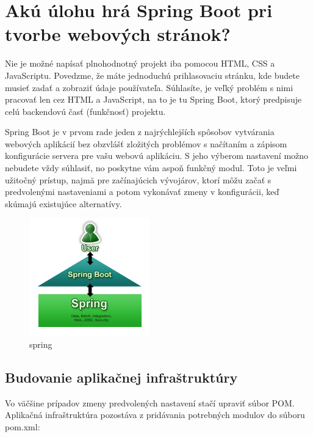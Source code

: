 \documentclass[12pt, letterpaper]{article}
\begin{document}
\section{Akú úlohu hrá Spring Boot pri tvorbe webových stránok?}
Nie je možné napísať plnohodnotný projekt iba pomocou HTML, CSS a JavaScriptu. Povedzme, že máte jednoduchú prihlasovaciu stránku, kde budete musieť zadať a zobraziť údaje používateľa. Súhlasíte, je veľký problém s nimi pracovať len cez HTML a JavaScript, na to je tu Spring Boot, ktorý predpisuje celú backendovú časť (funkčnosť) projektu.

	Spring Boot je v prvom rade jeden z najrýchlejších spôsobov vytvárania webových aplikácií bez obzvlášť zložitých problémov s načítaním a zápisom konfigurácie servera pre vašu webovú aplikáciu.
	S jeho výberom nastavení možno nebudete vždy súhlasiť, no poskytne vám aspoň funkčný modul. Toto je veľmi užitočný prístup, najmä pre začínajúcich vývojárov, ktorí môžu začať s predvolenými nastaveniami a potom vykonávať zmeny v konfigurácii, keď skúmajú existujúce alternatívy.

\begin{figure}[H]
	\centering
	\includegraphics[height=2in]{Spring_info.png}
	\caption[Optional caption]{spring\cite{Image_Info}}
\end{figure}

	\subsection{Budovanie aplikačnej infraštruktúry}
		Vo väčšine prípadov zmeny predvolených nastavení stačí upraviť súbor POM. Aplikačná infraštruktúra pozostáva z pridávania potrebných modulov do súboru pom.xml:
	
\end{document}
